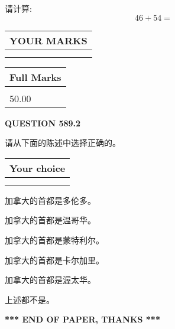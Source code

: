 \documentclass{ctexart}
\begin{document}
  
 
请计算:
\begin{equation}
46 +  %
54 = \nonumber
\end{equation}
 

 

 
  
\vspace{0.2in}
  
\noindent\begin{tabular}{|l|}
\hline
 YOUR MARKS  \\
\hline
 \\ 
 \\ 
\hline
\end{tabular}
\hspace{0.05in} \begin{tabular}{|l|}
\hline
 Full Marks  \\
\hline
 \\ 
50.00 \\
\hline
\end{tabular}
{\textbf{\Large{QUESTION
589.2 
}}}
  
  
请从下面的陈述中选择正确的。
  
  
\noindent\hspace{3.0in} \begin{tabular}{|l|}
\hline
Your choice \\
\hline
 \\ 
 \\ 
\hline
\end{tabular}
  
  
 
 
加拿大的首都是多伦多。
 
 
加拿大的首都是温哥华。
 
 
加拿大的首都是蒙特利尔。
 
 
加拿大的首都是卡尔加里。
 
 
加拿大的首都是渥太华。
 
 
 上述都不是。
 
 
   
   
 \vspace{0.2in}
 
   
   
   
   
\vspace{1.0in} 
{\textbf{\large{ *** END OF PAPER, THANKS *** }}} 
   
\end{document}
